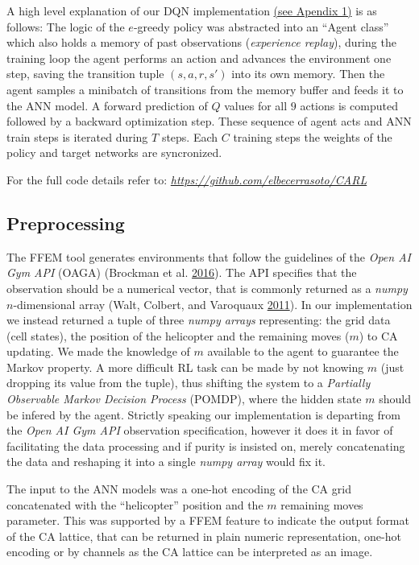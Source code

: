 \documentclass[
  openany]{book}
\begin{document}
A high level explanation of our DQN implementation \protect\hyperlink{deep-q-networks-dqn-using-open-ai-gym-api}{(see Apendix 1)} is as follows: The logic of the \(e\)-greedy policy was abstracted into an ``Agent class'' which also holds a memory of past observations (\emph{experience replay}), during the training loop the agent performs an action and advances the environment one step, saving the transition tuple \((s,a,r,s')\) into its own memory. Then the agent samples a minibatch of transitions from the memory buffer and feeds it to the ANN model. A forward prediction of \(Q\) values for all \(9\) actions is computed followed by a backward optimization step. These sequence of agent acts and ANN train steps is iterated during \(T\) steps. Each \(C\) training steps the weights of the policy and target networks are syncronized.

For the full code details refer to: \emph{\url{https://github.com/elbecerrasoto/CARL}}

\hypertarget{preprocessing}{%
\subsection{Preprocessing}\label{preprocessing}}

The FFEM tool generates environments that follow the guidelines of the \emph{Open AI Gym API} (OAGA) (Brockman et al. \protect\hyperlink{ref-1606.01540}{2016}). The API specifies that the observation should be a numerical vector, that is commonly returned as a \emph{numpy} \(n\)-dimensional array (Walt, Colbert, and Varoquaux \protect\hyperlink{ref-walt2011numpy}{2011}). In our implementation we instead returned a tuple of three \emph{numpy arrays} representing: the grid data (cell states), the position of the helicopter and the remaining moves (\(m\)) to CA updating. We made the knowledge of \(m\) available to the agent to guarantee the Markov property. A more difficult RL task can be made by not knowing \(m\) (just dropping its value from the tuple), thus shifting the system to a \emph{Partially Observable Markov Decision Process} (POMDP), where the hidden state \(m\) should be infered by the agent. Strictly speaking our implementation is departing from the \emph{Open AI Gym API} observation specification, however it does it in favor of facilitating the data processing and if purity is insisted on, merely concatenating the data and reshaping it into a single \emph{numpy array} would fix it.

The input to the ANN models was a one-hot encoding of the CA grid concatenated with the ``helicopter'' position and the \(m\) remaining moves parameter. This was supported by a FFEM feature to indicate the output format of the CA lattice, that can be returned in plain numeric representation, one-hot encoding or by channels as the CA lattice can be interpreted as an image.
\end{document}
